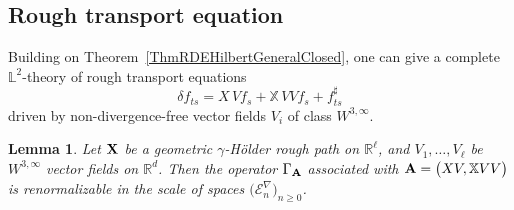 \documentclass[11pt,a4paper]{amsart}
\newcommand{\RR}{\mathbb{R}}  \newcommand{\CC}{\mathbb{C}}  \newcommand{\LL}{\mathbb{L}}  \newcommand{\WW}{\mathbb{W}}
\newcommand{\mcE}{\mathcal{E}}
\newcommand{\bbX}{\mathbb{X}}
\renewcommand{\geq}{\geqslant}
\newtheorem{lem}[thm]{\hspace{-0.15cm}  {\sc Lemma} }%
\numberwithin{equation}{section} %
\begin{document}
\medskip


\subsection{Rough transport equation}
\label{SubsectionL2Transport}

Building on Theorem~\ref{ThmRDEHilbertGeneralClosed}, one can give a complete $\LL^2$-theory of rough transport equations 
\begin{equation*}
\delta f_{ts} = X\,Vf_s +  \bbX\,V V f_s + f^\sharp_{ts}
\end{equation*} 
driven by non-divergence-free vector fields $V_i$ of class $W^{3,\infty}$.

\medskip

\begin{lem}
\label{LemmaGammaA}
Let ${\bf X}$ be a geometric $\gamma$-H\"older rough path on $\RR^\ell$, and $V_1,\dots,V_\ell$ be $W^{3,\infty}$ vector fields on $\RR^d$. Then the operator $\Gamma_{\bf A}$ associated with ${\bfA} = \big(XV, \bbX VV\big)$ is renormalizable in the scale of spaces $\big(\mcE^\nabla_n\big)_{n\geq 0}$.
\end{lem}

\smallskip 
\end{document}
